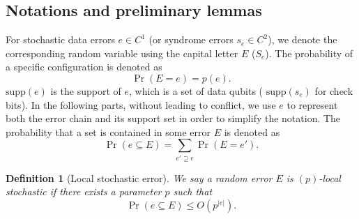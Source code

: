 \documentclass[twoside,english,aps,showpacs,pra,superscriptaddress]{revtex4-2}
\newtheorem{definition}{Definition}
\begin{document}
\subsection{Notations and preliminary lemmas}
For stochastic data errors $e\in C^1$ (or syndrome errors $s_e \in C^2$),  we denote the corresponding random variable using the capital letter $E$ ($S_e$). The probability of a specific configuration is denoted as 
\begin{equation}
    \Pr(E = e) = p(e).
\end{equation}
$\textrm{supp}(e)$ is the support of $e$, which is a set of data qubits ( $\textrm{supp}(s_e)$ for check bits). In the following parts, without leading to conflict, we use $e$ to represent both the error chain and its support set in order to simplify the notation. The probability that a set is contained in some error $E$ is denoted as 
\begin{equation}
    \Pr(e \subseteq E) = \sum_{e '\supseteq e} \Pr(E=e').
\end{equation}
\begin{definition}[Local stochastic error]
    We say a random error $E$ is $(p)$-local stochastic if there exists a parameter $p$ such that 
    \begin{equation}
        \Pr(e \subseteq E) \leq O\left(p^{|e|} \right).
    \end{equation}
\end{definition}
\end{document}
